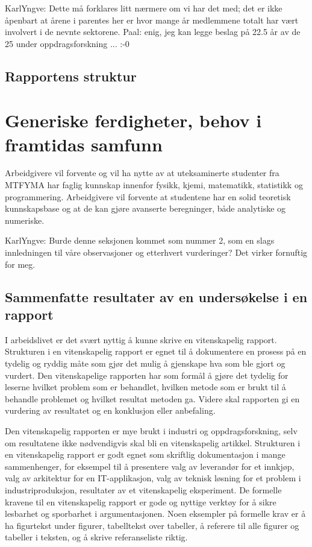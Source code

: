 \documentclass{article}
\begin{document}
{\color{red} KarlYngve: Dette må forklares litt nærmere om vi har det med; det er ikke åpenbart at årene i parentes her er hvor mange år medlemmene totalt har vært involvert i de nevnte sektorene. Paal: enig, jeg kan legge beslag på 22.5 år av de 25 under oppdragsforskning ... :-0 }

\subsection{Rapportens struktur}



\section{Generiske ferdigheter, behov i framtidas samfunn}
\label{Behov}
Arbeidgivere vil forvente og vil ha nytte av at uteksaminerte studenter fra MTFYMA har faglig kunnskap innenfor fysikk, kjemi, matematikk, statistikk og programmering.
Arbeidgivere vil forvente at studentene har en solid teoretisk kunnskapsbase og at de kan gjøre avanserte beregninger, både analytiske og numeriske.

{\color{red} KarlYngve: Burde denne seksjonen kommet som nummer 2, som en slags innledningen til våre observasjoner og etterhvert vurderinger? Det virker fornuftig for meg.}

\subsection{Sammenfatte resultater av en undersøkelse i en rapport}
I arbeidslivet er det svært nyttig å kunne skrive en vitenskapelig rapport.
Strukturen i en vitenskapelig rapport er egnet til å dokumentere en prosess på en tydelig og ryddig måte som gjør det mulig å gjenskape hva som ble gjort og vurdert.
Den vitenskapelige rapporten har som formål å gjøre det tydelig for leserne hvilket problem som er behandlet, hvilken metode som er brukt til å behandle problemet og hvilket resultat metoden ga.
Videre skal rapporten gi en vurdering av resultatet og en konklusjon eller anbefaling.

Den vitenskapelig rapporten er mye brukt i industri og oppdragsforskning, selv om resultatene ikke nødvendigvis skal bli en vitenskapelig artikkel.
Strukturen i en vitenskapelig rapport er godt egnet som skriftlig dokumentasjon i mange sammenhenger, for eksempel til å presentere valg av leverandør for et innkjøp, valg av arkitektur for en IT-applikasjon, valg av teknisk løsning for et problem i industriproduksjon, resultater av et vitenskapelig eksperiment.
De formelle kravene til en vitenskapelig rapport er gode og nyttige verktøy for å sikre lesbarhet og sporbarhet i argumentasjonen.
Noen eksempler på formelle krav er å ha figurtekst under figurer, tabelltekst over tabeller, å referere til alle figurer og tabeller i teksten, og å skrive referanseliste riktig.
\end{document}
